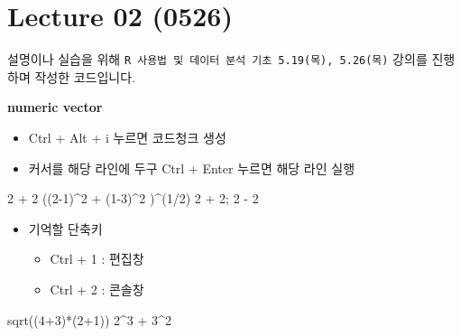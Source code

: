 \documentclass[
]{book}
\newenvironment{Shaded}{\begin{snugshade}}{\end{snugshade}}
\newcommand{\DecValTok}[1]{\textcolor[rgb]{0.00,0.00,0.81}{#1}}
\newcommand{\FunctionTok}[1]{\textcolor[rgb]{0.00,0.00,0.00}{#1}}
\newcommand{\NormalTok}[1]{#1}
\newcommand{\SpecialCharTok}[1]{\textcolor[rgb]{0.00,0.00,0.00}{#1}}
\providecommand{\tightlist}{%
  \setlength{\itemsep}{0pt}\setlength{\parskip}{0pt}}
\begin{document}
\hypertarget{lecture-02-0526}{%
\section{Lecture 02 (0526)}\label{lecture-02-0526}}

설명이나 실습을 위해 \texttt{R\ 사용법\ 및\ 데이터\ 분석\ 기초\ 5.19(목),\ 5.26(목)} 강의를 진행하며 작성한 코드입니다.

\textbf{numeric vector}

\begin{itemize}
\tightlist
\item
  Ctrl + Alt + i 누르면 코드청크 생성
\item
  커서를 해당 라인에 두구 Ctrl + Enter 누르면 해당 라인 실행
\end{itemize}

\begin{Shaded}
\begin{Highlighting}[]
\DecValTok{2} \SpecialCharTok{+} \DecValTok{2}
\NormalTok{((}\DecValTok{2{-}1}\NormalTok{)}\SpecialCharTok{\^{}}\DecValTok{2} \SpecialCharTok{+}\NormalTok{ (}\DecValTok{1{-}3}\NormalTok{)}\SpecialCharTok{\^{}}\DecValTok{2}\NormalTok{ )}\SpecialCharTok{\^{}}\NormalTok{(}\DecValTok{1}\SpecialCharTok{/}\DecValTok{2}\NormalTok{)}
\DecValTok{2} \SpecialCharTok{+} \DecValTok{2}\NormalTok{; }\DecValTok{2} \SpecialCharTok{{-}} \DecValTok{2}
\end{Highlighting}
\end{Shaded}

\begin{itemize}
\tightlist
\item
  기억할 단축키

  \begin{itemize}
  \tightlist
  \item
    Ctrl + 1 : 편집창
  \item
    Ctrl + 2 : 콘솔창
  \end{itemize}
\end{itemize}

\begin{Shaded}
\begin{Highlighting}[]
\FunctionTok{sqrt}\NormalTok{((}\DecValTok{4}\SpecialCharTok{+}\DecValTok{3}\NormalTok{)}\SpecialCharTok{*}\NormalTok{(}\DecValTok{2}\SpecialCharTok{+}\DecValTok{1}\NormalTok{))}
\DecValTok{2}\SpecialCharTok{\^{}}\DecValTok{3} \SpecialCharTok{+} \DecValTok{3}\SpecialCharTok{\^{}}\DecValTok{2}
\end{Highlighting}
\end{Shaded}
\end{document}
